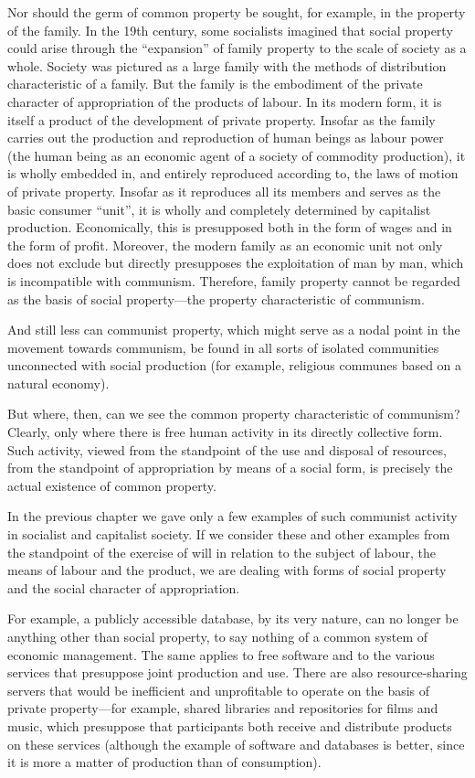 \documentclass[12pt,a4paper,openany]{book}
\begin{document}
Nor should the germ of common property be sought, for example, in the property of the family. In the 19th century, some socialists imagined that social property could arise through the “expansion” of family property to the scale of society as a whole. Society was pictured as a large family with the methods of distribution characteristic of a family. But the family is the embodiment of the private character of appropriation of the products of labour. In its modern form, it is itself a product of the development of private property. Insofar as the family carries out the production and reproduction of human beings as labour power (the human being as an economic agent of a society of commodity production), it is wholly embedded in, and entirely reproduced according to, the laws of motion of private property. Insofar as it reproduces all its members and serves as the basic consumer “unit”, it is wholly and completely determined by capitalist production. Economically, this is presupposed both in the form of wages and in the form of profit. Moreover, the modern family as an economic unit not only does not exclude but directly presupposes the exploitation of man by man, which is incompatible with communism. Therefore, family property cannot be regarded as the basis of social property—the property characteristic of communism.

And still less can communist property, which might serve as a nodal point in the movement towards communism, be found in all sorts of isolated communities unconnected with social production (for example, religious communes based on a natural economy).

But where, then, can we see the common property characteristic of communism? Clearly, only where there is free human activity in its directly collective form. Such activity, viewed from the standpoint of the use and disposal of resources, from the standpoint of appropriation by means of a social form, is precisely the actual existence of common property.

In the previous chapter we gave only a few examples of such communist activity in socialist and capitalist society. If we consider these and other examples from the standpoint of the exercise of will in relation to the subject of labour, the means of labour and the product, we are dealing with forms of social property and the social character of appropriation.

For example, a publicly accessible database, by its very nature, can no longer be anything other than social property, to say nothing of a common system of economic management. The same applies to free software and to the various services that presuppose joint production and use. There are also resource-sharing servers that would be inefficient and unprofitable to operate on the basis of private property—for example, shared libraries and repositories for films and music, which presuppose that participants both receive and distribute products on these services (although the example of software and databases is better, since it is more a matter of production than of consumption).
\end{document}
